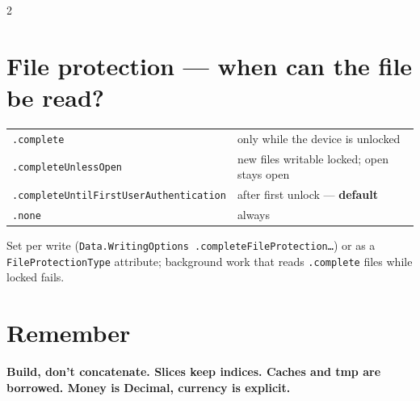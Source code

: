 \documentclass[8pt]{extarticle}
\begin{document}
\begin{multicols}{2}
\section{File protection — when can the file be read?}
{\footnotesize
\begin{tabular}{@{}l l@{}}
\toprule
\texttt{.complete} & only while the device is unlocked \\
\texttt{.completeUnlessOpen} & new files writable locked; open stays open \\
\texttt{.completeUntilFirstUserAuthentication} & after first unlock — \textbf{default} \\
\texttt{.none} & always \\
\bottomrule
\end{tabular}}\pdfonly{\\[1pt]}
{\scriptsize Set per write (\texttt{Data.WritingOptions .completeFileProtection…}) or as a
\texttt{FileProtectionType} attribute; background work that reads \texttt{.complete} files
while locked fails.}

\section{Remember}
\textbf{Build, don't concatenate. Slices keep indices. Caches and tmp are
borrowed. Money is Decimal, currency is explicit.}


\end{multicols}

\end{document}
